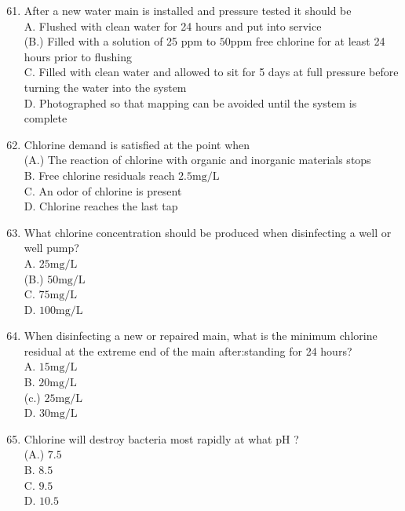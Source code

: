 \documentclass[10pt]{article}
\begin{document}
\begin{enumerate}
  \setcounter{enumi}{60}
  \item After a new water main is installed and pressure tested it should be\\
A. Flushed with clean water for 24 hours and put into service\\
(B.) Filled with a solution of 25 ppm to $50 \mathrm{ppm}$ free chlorine for at least 24 hours prior to flushing\\
C. Filled with clean water and allowed to sit for 5 days at full pressure before turning the water into the system\\
D. Photographed so that mapping can be avoided until the system is complete

  \item Chlorine demand is satisfied at the point when\\
(A.) The reaction of chlorine with organic and inorganic materials stops\\
B. Free chlorine residuals reach $2.5 \mathrm{mg} / \mathrm{L}$\\
C. An odor of chlorine is present\\
D. Chlorine reaches the last tap

  \item What chlorine concentration should be produced when disinfecting a well or well pump?\\
A. $25 \mathrm{mg} / \mathrm{L}$\\
(B.) $50 \mathrm{mg} / \mathrm{L}$\\
C. $75 \mathrm{mg} / \mathrm{L}$\\
D. $100 \mathrm{mg} / \mathrm{L}$

  \item When disinfecting a new or repaired main, what is the minimum chlorine residual at the extreme end of the main after:standing for 24 hours?\\
A. $15 \mathrm{mg} / \mathrm{L}$\\
B. $20 \mathrm{mg} / \mathrm{L}$\\
(c.) $25 \mathrm{mg} / \mathrm{L}$\\
D. $30 \mathrm{mg} / \mathrm{L}$

  \item Chlorine will destroy bacteria most rapidly at what $\mathrm{pH}$ ?\\
(A.) $7.5$\\
B. $8.5$\\
C. $9.5$\\
D. $10.5$


\end{enumerate}
\end{document}
